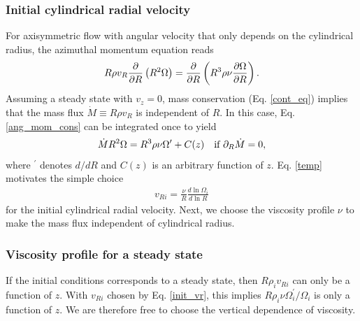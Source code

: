 \subsubsection{Initial cylindrical radial velocity}
For axisymmetric flow with angular velocity that only depends on the
cylindrical radius, the azimuthal momentum equation reads 
\begin{align}\label{ang_mom_cons}
  R\rho v_R\frac{\partial}{\partial R}\left(R^2\Omega \right) = \frac{\partial}{\partial
    R}\left(R^3\rho\nu\frac{\partial\Omega}{\partial R}\right). 
\end{align}
Assuming a steady state with $v_z=0$, mass
conservation (Eq. \ref{cont_eq}) implies that the mass flux  
$\dot{M}\equiv R\rho v_R$ is independent of $R$. In this case,
Eq. \ref{ang_mom_cons} can 
be integrated once to yield 
\begin{align}\label{temp}
  \dot{M}R^2\Omega = R^3\rho\nu\Omega^\prime + C(z) \quad \text{if $\partial_R\dot{M}$} = 0, 
\end{align}
where $^\prime$ denotes $d/dR$ and $C(z)$ is an arbitrary function of
$z$. Eq. \ref{temp} motivates the simple choice
\begin{align}\label{init_vr} 
  v_{Ri} = \frac{\nu}{R}\frac{d\ln{\Omega_i}}{d\ln{R}} 
\end{align}
for the initial cylindrical radial velocity. Next, we choose the
viscosity profile $\nu$ to make the mass flux independent of
cylindrical radius.  

\subsubsection{Viscosity profile for a steady state}\label{visc_model}
If the initial conditions corresponds to a steady state, then
$R \rho_i v_{Ri}$ can only be a function of $z$. With $v_{Ri}$ chosen
by Eq. \ref{init_vr}, this implies 
$R\rho_i\nu\Omega_i^\prime/\Omega_i$ is only a function of $z$. We are
therefore free to choose the vertical dependence of viscosity.   

